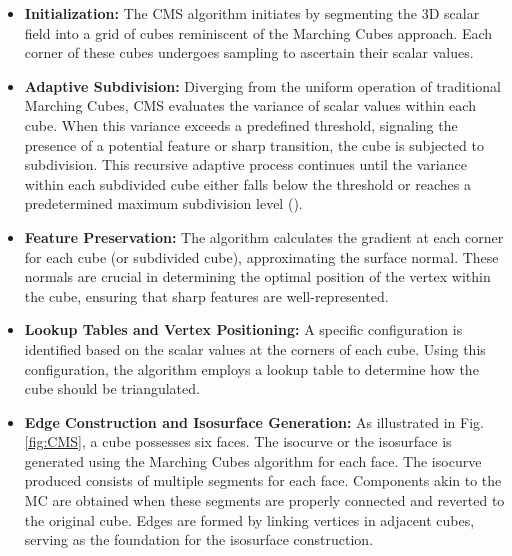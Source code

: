 \begin{itemize}
\item \textbf{Initialization:}
The CMS algorithm initiates by segmenting the 3D scalar field into a grid of cubes reminiscent of the Marching Cubes approach. Each corner of these cubes undergoes sampling to ascertain their scalar values.

\item \textbf{Adaptive Subdivision:}
Diverging from the uniform operation of traditional Marching Cubes, CMS evaluates the variance of scalar values within each cube. When this variance exceeds a predefined threshold, signaling the presence of a potential feature or sharp transition, the cube is subjected to subdivision. This recursive adaptive process continues until the variance within each subdivided cube either falls below the threshold or reaches a predetermined maximum subdivision level (\cite{Chien-Chang_2005}).

\item \textbf{Feature Preservation:}
The algorithm calculates the gradient at each corner for each cube (or subdivided cube), approximating the surface normal. These normals are crucial in determining the optimal position of the vertex within the cube, ensuring that sharp features are well-represented.

\item \textbf{Lookup Tables and Vertex Positioning:}
A specific configuration is identified based on the scalar values at the corners of each cube. Using this configuration, the algorithm employs a lookup table to determine how the cube should be triangulated.

\item \textbf{Edge Construction and Isosurface Generation:}
As illustrated in Fig. \ref{fig:CMS}, a cube possesses six faces. The isocurve or the isosurface is generated using the Marching Cubes algorithm for each face. The isocurve produced consists of multiple segments for each face. Components akin to the MC are obtained when these segments are properly connected and reverted to the original cube. Edges are formed by linking vertices in adjacent cubes, serving as the foundation for the isosurface construction.


\end{itemize}
